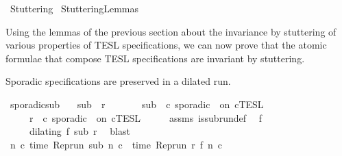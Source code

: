%
\begin{isabellebody}%
%
%
\isadelimdocument
%
\endisadelimdocument
%
\isatagdocument
%
\isamarkuptrue%
%
\endisatagdocument
{\isafolddocument}%
%
\isadelimdocument
%
\endisadelimdocument
%
\isadelimtheory
%
\endisadelimtheory
%
\isatagtheory
{}\isamarkupfalse%
\ Stuttering\isanewline
{}\ StutteringLemmas\isanewline
\isanewline
{}%
\endisatagtheory
{\isafoldtheory}%
%
\isadelimtheory
%
\endisadelimtheory
%
\begin{isamarkuptext}%
Using the lemmas of the previous section about the invariance by stuttering
  of various properties of TESL specifications, we can now prove that the atomic 
  formulae that compose TESL specifications are invariant by stuttering.%
\end{isamarkuptext}\isamarkuptrue%
%
\begin{isamarkuptext}%
Sporadic specifications are preserved in a dilated run.%
\end{isamarkuptext}\isamarkuptrue%
\isamarkupfalse%
\ sporadic{\isacharunderscore}sub{\isacharcolon}\isanewline
\ \ \ {\isacartoucheopen}sub\ {\isasymlless}\ r{\isacartoucheclose}\isanewline
\ \ \ \ \ \ \ {\isacartoucheopen}sub\ {\isasymin}\ {\isasymlbrakk}c\ sporadic\ {\isasymtau}\ on\ c{\isacharprime}{\isasymrbrakk}\isactrlsub T\isactrlsub E\isactrlsub S\isactrlsub L{\isacartoucheclose}\isanewline
\ \ \ \ \ {\isacartoucheopen}r\ {\isasymin}\ {\isasymlbrakk}c\ sporadic\ {\isasymtau}\ on\ c{\isacharprime}{\isasymrbrakk}\isactrlsub T\isactrlsub E\isactrlsub S\isactrlsub L{\isacartoucheclose}\isanewline
%
\isadelimproof
%
\endisadelimproof
%
\isatagproof
{}\isamarkupfalse%
\ {\isacharminus}\isanewline
\ \ \isamarkupfalse%
\ assms{\isacharparenleft}{}{\isacharparenright}\ is{\isacharunderscore}subrun{\isacharunderscore}def\ \isamarkupfalse%
\ f\isanewline
\ \ \ \ \ {\isacartoucheopen}dilating\ f\ sub\ r{\isacartoucheclose}\ \isamarkupfalse%
\ blast\isanewline
\ \ \isamarkupfalse%
\ {\isacartoucheopen}{\isasymforall}n\ c{\isachardot}\ time\ {\isacharparenleft}{\isacharparenleft}Rep{\isacharunderscore}run\ sub{\isacharparenright}\ n\ c{\isacharparenright}\ {\isacharequal}\ time\ {\isacharparenleft}{\isacharparenleft}Rep{\isacharunderscore}run\ r{\isacharparenright}\ {\isacharparenleft}f\ n{\isacharparenright}\ c{\isacharparenright}\isanewline

\end{isabellebody}

